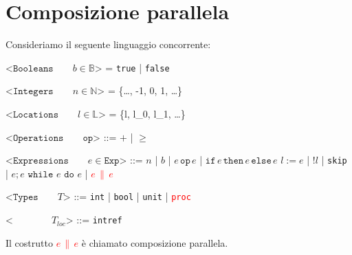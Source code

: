 \section{Composizione parallela}
Consideriamo il seguente linguaggio concorrente:
\begin{grammar}
    <$\texttt{Booleans} \qquad b \in \mathbb{B}$> = \texttt{true} | \texttt{false}

    <$\texttt{Integers} \qquad n \in \mathbb{N}$> = \{\dots, -1, 0, 1, \dots\}

    <$\texttt{Locations} \qquad l \in \mathbb{L}$> = \{l, l_0, l_1, \dots\}

    <$\texttt{Operations} \qquad \texttt{op}$> ::= $+$ | $\geq$

    <$\texttt{Expressions} \qquad e \in \texttt{Exp}$> ::= $n$ | $b$ | $e \, \texttt{op} \, e$ | 
    $\texttt{if} \, e \, \texttt{then} \, e \, \texttt{else} \, e$ \alt 
    $l:=e$ | $!l$ | \texttt{skip} | $e;e$ \alt 
    $\texttt{while }e \texttt{ do } e$ | \textcolor{red}{$e \, \parallel \, e$}

    <$\texttt{Types} \qquad T$> ::= \texttt{int} | \texttt{bool} | \texttt{unit} | \texttt{\textcolor{red}{proc}}

    <$\qquad \qquad T_{loc}$> ::= \texttt{intref}
\end{grammar}
Il costrutto \textcolor{red}{$e \, \parallel \, e$} è chiamato composizione parallela.
